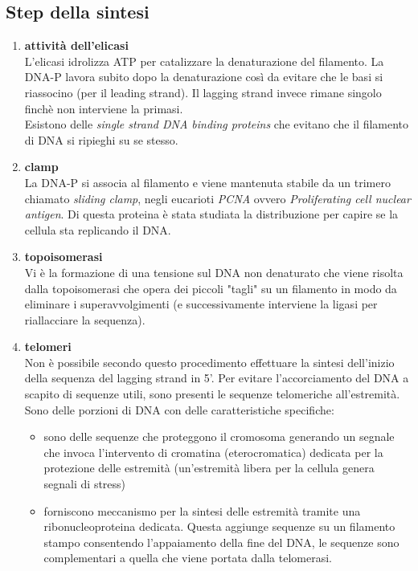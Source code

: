         \subsection{Step della sintesi}
            \begin{enumerate}
                \item \textbf{attività dell'elicasi}\\
                L'elicasi idrolizza ATP per catalizzare la denaturazione del filamento. La DNA-P lavora subito dopo la denaturazione così da evitare che le basi si riassocino (per il leading strand). Il lagging strand invece rimane singolo finchè non interviene la primasi.\\
                Esistono delle \textit{single strand DNA binding proteins} che evitano che il filamento di DNA si ripieghi su se stesso.
                \item \textbf{clamp}\\
                La DNA-P si associa al filamento e viene mantenuta stabile da un trimero chiamato \textit{sliding clamp}, negli eucarioti \textit{PCNA} ovvero \textit{Proliferating cell nuclear antigen}. Di questa proteina è stata studiata la distribuzione per capire se la cellula sta replicando il DNA.
                \item \textbf{topoisomerasi}\\
                Vi è la formazione di una tensione sul DNA non denaturato che viene risolta dalla topoisomerasi che opera dei piccoli "tagli" su un filamento in modo da eliminare i superavvolgimenti (e successivamente interviene la ligasi per riallacciare la sequenza).
                \item \textbf{telomeri}\\
                Non è possibile secondo questo procedimento effettuare la sintesi dell'inizio della sequenza del lagging strand in 5'. Per evitare l'accorciamento del DNA a scapito di sequenze utili, sono presenti le sequenze telomeriche all'estremità. Sono delle porzioni di DNA con delle caratteristiche specifiche:
                \begin{itemize}
                    \item sono delle sequenze che proteggono il cromosoma generando un segnale che invoca l'intervento di cromatina (eterocromatica) dedicata per la protezione delle estremità (un'estremità libera per la cellula genera segnali di stress)
                    \item forniscono meccanismo per la sintesi delle estremità tramite una ribonucleoproteina dedicata. Questa aggiunge sequenze su un filamento stampo consentendo l'appaiamento della fine del DNA, le sequenze sono complementari a quella che viene portata dalla telomerasi. 
                \end{itemize}
            \end{enumerate}
